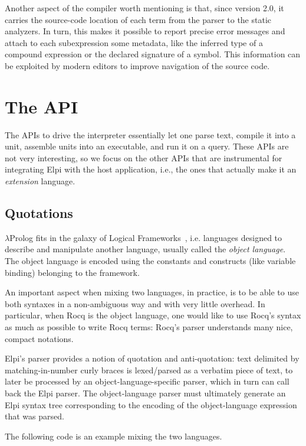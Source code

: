 \documentclass[a4paper, 11pt]{book}
\begin{document}
Another aspect of the compiler worth mentioning is that, since version 2.0, it
carries the source-code location of each term from the parser to the static
analyzers. In turn, this makes it possible to report precise error messages and
attach to each subexpression some metadata, like the inferred type of a
compound expression or the declared signature of a symbol. This information can be
exploited by modern editors to improve navigation of the source code.

\section{The API}\label{sec:API}


The APIs to drive the interpreter essentially let one parse text, compile it
into a unit, assemble units into an executable, and run it on a query. These
APIs are not very interesting, so we focus on the other APIs that are
instrumental for integrating Elpi with the host application, i.e., the ones
that actually make it an \emph{extension} language.

\subsection{Quotations}\label{sec:quotations}

$\lambda$Prolog fits in the galaxy of Logical Frameworks~\cite{HarperHP87},
i.e. languages designed to describe and manipulate another language,
usually called the \emph{object language}. The object language is encoded
using the constants and constructs (like variable binding) belonging to the
framework.


An important aspect when mixing two languages, in practice, is to be able to
use both syntaxes in a non-ambiguous way and with very little overhead. In
particular, when Rocq is the object language, one would like to use Rocq's
syntax as much as possible to write Rocq terms: Rocq's parser understands many
nice, compact notations.


Elpi's parser provides a notion of quotation and anti-quotation: text delimited
by matching-in-number curly braces is lexed/parsed as a verbatim piece of text,
to later be processed by an object-language-specific parser, which in turn can
call back the Elpi parser. The object-language parser must ultimately generate
an Elpi syntax tree corresponding to the encoding of the object-language
expression that was parsed.

The following code is an example mixing the two languages.
\end{document}
